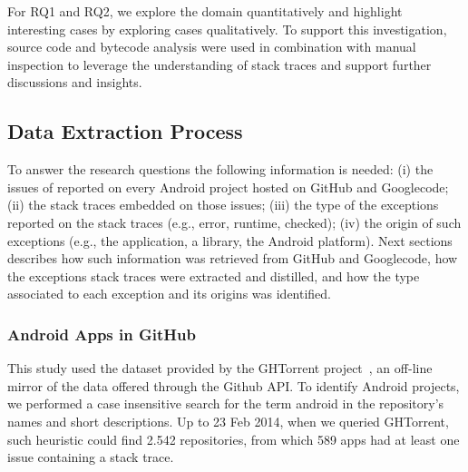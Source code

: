 \documentclass[conference]{IEEEtran}
\begin{document}

For RQ1 and RQ2, we explore the domain quantitatively and highlight interesting cases by 
exploring cases qualitatively. To support this investigation, source code and bytecode 
analysis were used in combination with manual inspection to leverage the  understanding 
of stack traces and support further discussions and insights. 


\subsection{Data Extraction Process}
\label{sec:miningproc}

To answer the research questions the following information is needed: (i) the issues of reported on every Android project hosted on 
GitHub and Googlecode; (ii) the stack traces embedded on those issues; (iii) the type of the exceptions
 reported on the stack traces (e.g., error, runtime, checked); (iv) the origin of such exceptions 
(e.g., the application, a library, the Android platform). Next sections describes how such information 
was retrieved from GitHub and Googlecode, how the exceptions stack traces were extracted and distilled,
 and how the type associated to each exception and its origins was identified.


\subsubsection{Android Apps in GitHub}
\label{sec:git}


This study used the dataset provided by the GHTorrent project~\cite{Gousi13}, 
an off-line mirror of the data  offered through the Github API.  
To identify Android projects, we performed a case insensitive search for the
term \textsf{android} in the repository's names and short descriptions.  
Up to 23 Feb 2014,  when we queried GHTorrent, such heuristic could
 find 2.542 repositories,  from which 589 apps had at least one
issue containing a stack trace.
\end{document}
